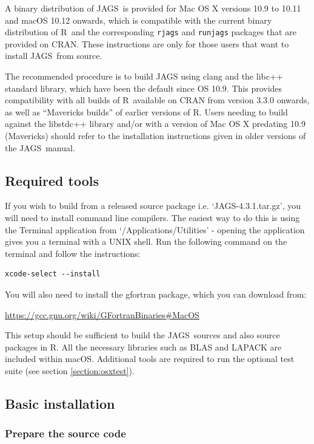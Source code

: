 \documentclass[11pt, a4paper, titlepage]{article}
\newcommand{\release}{4.3.1}
\newcommand{\JAGS}{\textsf{JAGS}}
\newcommand{\R}{\textsf{R}}
\newcommand{\file}[1]{{`\normalfont\textsf{#1}'}}
\begin{document}
A binary distribution of \JAGS\ is provided for Mac OS X versions 
10.9 to 10.11 and macOS 10.12 onwards, which is compatible with the
current binary distribution of \R\ and the corresponding \texttt{rjags} 
and \texttt{runjags} packages that are provided on CRAN. These instructions 
are only for those users that want to install \JAGS\ from source.

The recommended procedure is to build JAGS using clang and the libc++ 
standard library, which have been the default since OS 10.9.  This provides 
compatibility with all builds of \R\ available on CRAN from version 3.3.0 
onwards, as well as ``Mavericks builds'' of earlier versions of \R.  Users 
needing to build against the libstdc++ library and/or with a version of 
Mac OS X predating 10.9 (Mavericks) should refer to the installation 
instructions given in older versions of the \JAGS~manual.

\subsection{Required tools}

If you wish to build from a released source package i.e.
\file{JAGS-\release.tar.gz}, you will need to install command line compilers. 
The easiest way to do this is using the Terminal application from 
\file{/Applications/Utilities} - opening the application gives you a terminal 
with a UNIX shell.  Run the following command on the terminal and follow the
instructions:

\begin{verbatim}
xcode-select --install
\end{verbatim}


You will also need to install the gfortran package, which you 
can download from:

\url{https://gcc.gnu.org/wiki/GFortranBinaries#MacOS}

This setup should be sufficient to build the \JAGS\ sources and also source
packages in R.  All the necessary libraries such as BLAS and LAPACK are
included within macOS.  Additional tools are required to run the optional 
test suite (see section \ref{section:osxtest}).


\subsection{Basic installation}


\subsubsection{Prepare the source code}
\end{document}
